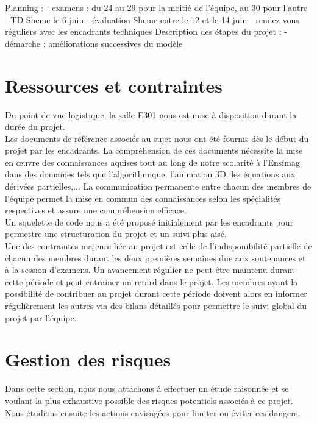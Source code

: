 \documentclass[a4paper,11pt]{article}
\begin{document}
Planning :
- examens : du 24 au 29 pour la moitié de l'équipe, au 30 pour l'autre
- TD Sheme le 6 juin
- évaluation Sheme entre le 12 et le 14 juin
- rendez-vous réguliers avec les encadrants techniques
Description des étapes du projet :
- démarche : améliorations successives du modèle

\section{Ressources et contraintes}

Du point de vue logistique, la salle E301 nous est mise à disposition durant la durée du projet.\\

Les documents de référence associés au sujet nous ont été fournis dès le début du projet par les encadrants. La compréhension de ces documents nécessite la mise en \oe{}uvre des connaissances aquises tout au long de notre scolarité à l'Ensimag dans des domaines tels que l'algorithmique, l'animation 3D, les équations aux dérivées partielles,... La communication permanente entre chacun des membres de l'équipe permet la mise en commun des connaissances selon les spécialités respectives et assure une compréhension efficace.\\

Un squelette de code nous a été proposé initialement par les encadrants pour permettre une structuration du projet et un suivi plus aisé.\\ 

Une des contraintes majeure liée au projet est celle de l'indisponibilité partielle de chacun des membres durant les deux premières semaines due aux soutenances et à la session d'examens. Un avancement régulier ne peut être maintenu durant cette période et peut entrainer un retard dans le projet. Les membres ayant la possibilité de contribuer au projet durant cette période doivent alors en informer régulièrement les autres via des bilans détaillés pour permettre le suivi global du projet par l'équipe.\\

\section{Gestion des risques}

Dans cette section, nous nous attachons à effectuer un étude raisonnée et 
se voulant la plus exhaustive possible des risques potentiels associés à ce projet. Nous étudions ensuite les actions envisagées pour limiter ou éviter ces dangers.\\
\end{document}
